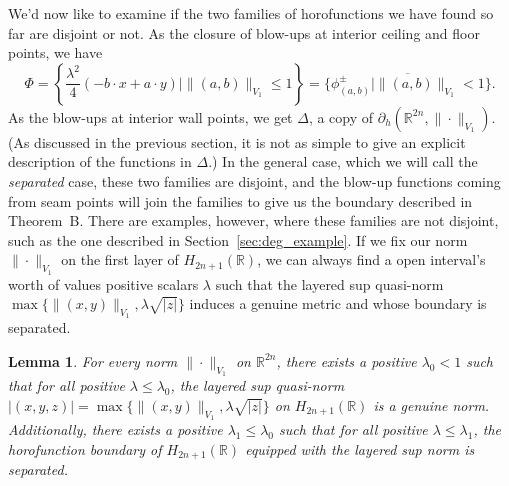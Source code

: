 \documentclass{article}
\newtheorem{lemma}[theorem]{Lemma}
\theoremstyle{definition}
\newcommand{\norm}[1]{\|#1\|}
\newcommand{\bhor}{\partial_h}
\newcommand{\HHR}{H_{2n+1}(\mathbb{R})}
\newcommand{\R}{{\mathbb R}}
\begin{document}
We'd now like to examine if the two families of horofunctions we have found so far are disjoint or not. As the closure of blow-ups at interior ceiling and floor points, we have 
\[\Phi = \left\{\frac{\lambda^2}4(-b\cdot x + a\cdot y)\mid \norm{(a,b)}_{V_1} \leq 1\right\} = \overline{\{\phi^\pm_{(a,b)}\mid \norm{(a,b)}_{V_1} < 1\}}.
\]  As the blow-ups at interior wall points, we get $\Delta$, a copy of $\bhor(\R^{2n}, \norm{\cdot}_{V_1})$. (As discussed in the previous section, it is not as simple to give an explicit description of the functions in $\Delta$.) In the general case, which we will call the {\em separated} case, these two families are disjoint, and the blow-up functions coming from seam points will join the families to give us the boundary described in Theorem~B. There are examples, however, where these families are not disjoint, such as the one described in Section~\ref{sec:deg_example}. If we fix our norm $\norm{\cdot}_{V_1}$ on the first layer of $\HHR$, we can always find a open interval's worth of values positive scalars $\lambda$ such that the layered sup quasi-norm $\max \{\norm{(x,y)}_{V_1}, \lambda \sqrt{|z|}\}$ induces a genuine metric and whose boundary is separated.

\begin{lemma}
For every norm $\norm{\cdot}_{V_1}$ on $\R^{2n}$, there exists a positive $\lambda_0 < 1$ such that for all positive $\lambda \leq \lambda_0$, the layered sup quasi-norm $|(x,y,z)| = \max \{\norm{(x,y)}_{V_1}, \lambda \sqrt{|z|}\}$ on $\HHR$ is a genuine norm. Additionally, there exists a positive $\lambda_1 \leq \lambda_0$ such that for all positive $\lambda \leq \lambda_1$, the horofunction boundary of $\HHR$ equipped with the layered sup norm is separated.
\end{lemma}
\end{document}
